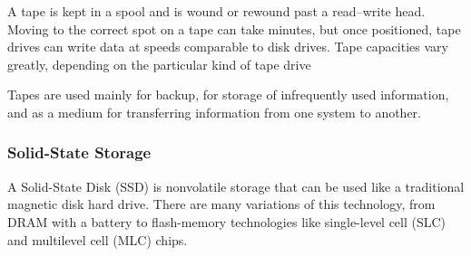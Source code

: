 A tape is kept in a spool and is wound or rewound past a read–write head.
Moving to the correct spot on a tape can take minutes, but once positioned, tape drives can write data at speeds comparable to disk drives.
Tape capacities vary greatly, depending on the particular kind of tape drive

Tapes are used mainly for backup, for storage of infrequently used information, and as a medium for transferring information from one system to another.

\subsubsection{Solid-State Storage}\label{subsubsec:Solid_State_Storage}
A Solid-State Disk (SSD) is nonvolatile storage that can be used like a traditional magnetic disk hard drive.
There are many variations of this technology, from DRAM with a battery to flash-memory technologies like single-level cell (SLC) and multilevel cell (MLC) chips.

